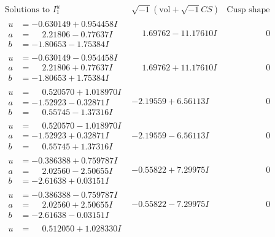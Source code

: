 \documentclass[1p]{elsarticle_modified}
\theoremstyle{definition}
\newcommand{\I}{\sqrt{-1}}
\begin{document}
$$\begin{array}{c|c|c}
\text{Solutions to }I^u_{1}& \I (\text{vol} + \sqrt{-1}CS) & \text{Cusp shape}\\
 \hline 
\begin{aligned}
u &= -0.630149 + 0.954458 I \\
a &= \phantom{-}2.21806 - 0.77637 I \\
b &= -1.80653 - 1.75384 I\end{aligned}
 & \phantom{-}1.69762 - 11.17610 I & \phantom{-0.000000 } 0 \\ \hline\begin{aligned}
u &= -0.630149 - 0.954458 I \\
a &= \phantom{-}2.21806 + 0.77637 I \\
b &= -1.80653 + 1.75384 I\end{aligned}
 & \phantom{-}1.69762 + 11.17610 I & \phantom{-0.000000 } 0 \\ \hline\begin{aligned}
u &= \phantom{-}0.520570 + 1.018970 I \\
a &= -1.52923 - 0.32871 I \\
b &= \phantom{-}0.55745 - 1.37316 I\end{aligned}
 & -2.19559 + 6.56113 I & \phantom{-0.000000 } 0 \\ \hline\begin{aligned}
u &= \phantom{-}0.520570 - 1.018970 I \\
a &= -1.52923 + 0.32871 I \\
b &= \phantom{-}0.55745 + 1.37316 I\end{aligned}
 & -2.19559 - 6.56113 I & \phantom{-0.000000 } 0 \\ \hline\begin{aligned}
u &= -0.386388 + 0.759787 I \\
a &= \phantom{-}2.02560 - 2.50655 I \\
b &= -2.61638 + 0.03151 I\end{aligned}
 & -0.55822 + 7.29975 I & \phantom{-0.000000 } 0 \\ \hline\begin{aligned}
u &= -0.386388 - 0.759787 I \\
a &= \phantom{-}2.02560 + 2.50655 I \\
b &= -2.61638 - 0.03151 I\end{aligned}
 & -0.55822 - 7.29975 I & \phantom{-0.000000 } 0 \\ \hline\begin{aligned}
u &= \phantom{-}0.512050 + 1.028330 I \\

\end{aligned}
\end{array}$$
\end{document}
